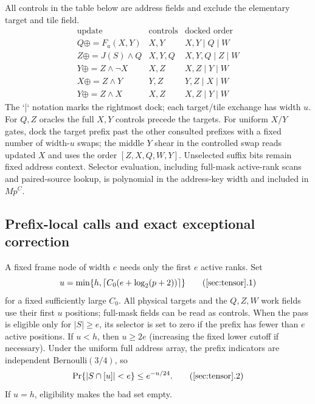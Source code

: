 All controls in the table below are address fields and exclude the elementary target and tile field.
\[
\begin{array}{c|c|c}
\text{update}&\text{controls}&\text{docked order}\\
\hline
Q\mathbin\oplus=F_a(X,Y)&X,Y&X,Y\mid Q\mid W\\
Z\mathbin\oplus=J(S)\land Q&X,Y,Q&X,Y,Q\mid Z\mid W\\
Y\mathbin\oplus=Z\land\neg X&X,Z&X,Z\mid Y\mid W\\
X\mathbin\oplus=Z\land Y&Y,Z&Y,Z\mid X\mid W\\
Y\mathbin\oplus=Z\land X&X,Z&X,Z\mid Y\mid W
\end{array}
\]
The `|` notation marks the rightmost dock; each target/tile exchange has width $u$. For $Q,Z$ oracles the full $X,Y$ controls precede the targets. For uniform $X/Y$ gates, dock the target prefix past the other consulted prefixes with a fixed number of width-$u$ swaps; the middle $Y$ shear in the controlled swap reads updated $X$ and uses the order $[Z,X,Q,W,Y]$. Unselected suffix bits remain fixed address context. Selector evaluation, including full-mask active-rank scans and paired-source lookup, is polynomial in the address-key width and included in $Mp^C$.

\subsection{Prefix-local calls and exact exceptional correction}

A fixed frame node of width $e$ needs only the first $e$ active ranks. Set
\[
 u=\min\{h,\lceil C_0(e+\log_2(p+2))\rceil\}
 \tag{\ref{sec:tensor}.1}
\]
for a fixed sufficiently large $C_0$. All physical targets and the $Q,Z,W$ work fields use their first $u$ positions; full-mask fields can be read as controls. When the pass is eligible only for $|S|\ge e$, its selector is set to zero if the prefix has fewer than $e$ active positions. If $u<h$, then $u\ge2e$ (increasing the fixed lower cutoff if necessary). Under the uniform full address array, the prefix indicators are independent Bernoulli$(3/4)$, so
\[
 \Pr\{|S\cap[u]|<e\}\le e^{-u/24}.
 \tag{\ref{sec:tensor}.2}
\]
If $u=h$, eligibility makes the bad set empty.

